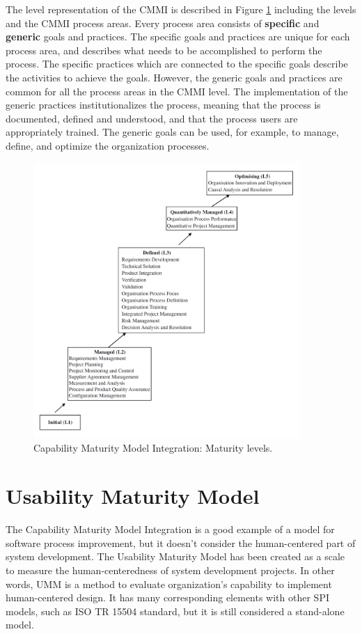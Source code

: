 \documentclass[12pt,a4paper,oneside,pdftex]{report}
\begin{document}
The level representation of the CMMI is described in Figure \ref{fig:cmmi} including the levels and the CMMI process areas. Every process area consists of \textbf{specific} and \textbf{generic} goals and practices. The specific goals and practices are unique for each process area, and describes what needs to be accomplished to perform the process. The specific practices which are connected to the specific goals describe the activities to achieve the goals. However, the generic goals and practices are common for all the process areas in the CMMI level. The implementation of the generic practices institutionalizes the process, meaning that the process is documented, defined and understood, and that the process users are appropriately trained. The generic goals can be used, for example, to manage, define, and optimize the organization processes.\citep{RefWorks:29}	

\begin{figure}[H]
  	\centering
  	\includegraphics[width=0.9\textwidth]{./images/cmmi_levels.png}
  	\caption{Capability Maturity Model Integration: Maturity levels. \citep{RefWorks:29}}
	\label{fig:cmmi}
\end{figure}



\section{Usability Maturity Model}
The Capability Maturity Model Integration is a good example of a model for software process improvement, but it doesn't consider the human-centered part of system development. The Usability Maturity Model has been created as a scale to measure the human-centeredness of system development projects. In other words, UMM is a method to evaluate organization's capability to implement human-centered design. It has many corresponding elements with other SPI models, such as ISO TR 15504 standard, but it is still considered a stand-alone model. \citep{RefWorks:30}	
\end{document}
